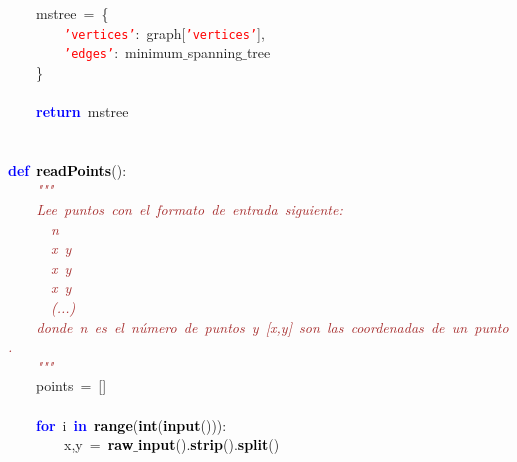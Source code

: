 \mbox{}\ \ \ \ mstree\ \textcolor{BrickRed}{=}\ \textcolor{BrickRed}{\{} \\
\mbox{}\ \ \ \ \ \ \ \ \texttt{\textcolor{Red}{'vertices'}}\textcolor{BrickRed}{:}\ graph\textcolor{BrickRed}{[}\texttt{\textcolor{Red}{'vertices'}}\textcolor{BrickRed}{],} \\
\mbox{}\ \ \ \ \ \ \ \ \texttt{\textcolor{Red}{'edges'}}\textcolor{BrickRed}{:}\ minimum$\_$spanning$\_$tree \\
\mbox{}\ \ \ \ \textcolor{BrickRed}{\}} \\
\mbox{} \\
\mbox{}\ \ \ \ \textbf{\textcolor{Blue}{return}}\ mstree \\
\mbox{} \\
\mbox{} \\
\mbox{}\textbf{\textcolor{Blue}{def}}\ \textbf{\textcolor{Black}{readPoints}}\textcolor{BrickRed}{():} \\
\mbox{}\textit{\textcolor{Brown}{\ \ \ \ "{}"{}"{}}} \\
\mbox{}\textit{\textcolor{Brown}{\ \ \ \ Lee\ puntos\ con\ el\ formato\ de\ entrada\ siguiente:}} \\
\mbox{}\textit{\textcolor{Brown}{\ \ \ \ \ \ n}} \\
\mbox{}\textit{\textcolor{Brown}{\ \ \ \ \ \ x\ y}} \\
\mbox{}\textit{\textcolor{Brown}{\ \ \ \ \ \ x\ y}} \\
\mbox{}\textit{\textcolor{Brown}{\ \ \ \ \ \ x\ y}} \\
\mbox{}\textit{\textcolor{Brown}{\ \ \ \ \ \ (...)}} \\
\mbox{}\textit{\textcolor{Brown}{\ \ \ \ donde\ n\ es\ el\ número\ de\ puntos\ y\ [x,y]\ son\ las\ coordenadas\ de\ un\ punto.}} \\
\mbox{}\textit{\textcolor{Brown}{\ \ \ \ "{}"{}"{}}} \\
\mbox{}\ \ \ \ points\ \textcolor{BrickRed}{=}\ \textcolor{BrickRed}{[]} \\
\mbox{} \\
\mbox{}\ \ \ \ \textbf{\textcolor{Blue}{for}}\ i\ \textbf{\textcolor{Blue}{in}}\ \textbf{\textcolor{Black}{range}}\textcolor{BrickRed}{(}\textbf{\textcolor{Black}{int}}\textcolor{BrickRed}{(}\textbf{\textcolor{Black}{input}}\textcolor{BrickRed}{())):} \\
\mbox{}\ \ \ \ \ \ \ \ x\textcolor{BrickRed}{,}y\ \textcolor{BrickRed}{=}\ \textbf{\textcolor{Black}{raw$\_$input}}\textcolor{BrickRed}{().}\textbf{\textcolor{Black}{strip}}\textcolor{BrickRed}{().}\textbf{\textcolor{Black}{split}}\textcolor{BrickRed}{()} \\

